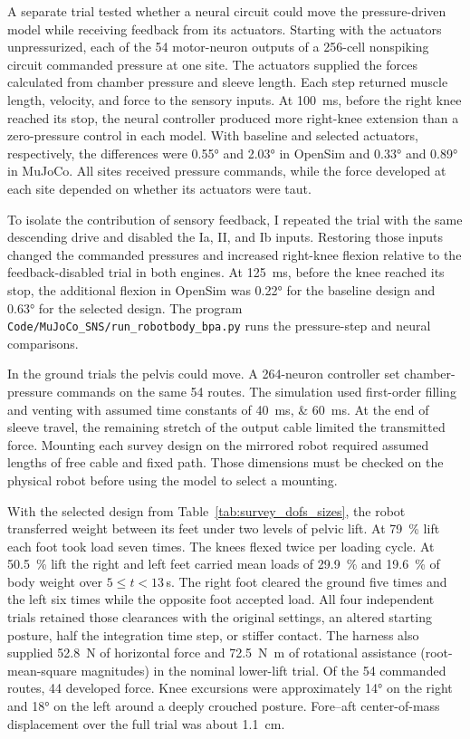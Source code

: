 A separate trial tested whether a neural circuit could move the pressure-driven model while receiving feedback from its actuators. Starting with the actuators unpressurized, each of the 54 motor-neuron outputs of a 256-cell nonspiking circuit commanded pressure at one site. The actuators supplied the forces calculated from chamber pressure and sleeve length. Each step returned muscle length, velocity, and force to the sensory inputs. At \qty{100}{\milli\second}, before the right knee reached its stop, the neural controller produced more right-knee extension than a zero-pressure control in each model. With baseline and selected actuators, respectively, the differences were \ang{0.55} and \ang{2.03} in OpenSim and \ang{0.33} and \ang{0.89} in MuJoCo. All sites received pressure commands, while the force developed at each site depended on whether its actuators were taut.

To isolate the contribution of sensory feedback, I repeated the trial with the same descending drive and disabled the Ia, II, and Ib inputs. Restoring those inputs changed the commanded pressures and increased right-knee flexion relative to the feedback-disabled trial in both engines. At \qty{125}{\milli\second}, before the knee reached its stop, the additional flexion in OpenSim was \ang{0.22} for the baseline design and \ang{0.63} for the selected design. The program \nolinkurl{Code/MuJoCo_SNS/run_robotbody_bpa.py} runs the pressure-step and neural comparisons.

In the ground trials the pelvis could move. A 264-neuron controller set chamber-pressure commands on the same 54 routes. The simulation used first-order filling and venting with assumed time constants of \qtylist{40;60}{\milli\second}. At the end of sleeve travel, the remaining stretch of the output cable limited the transmitted force. Mounting each survey design on the mirrored robot required assumed lengths of free cable and fixed path. Those dimensions must be checked on the physical robot before using the model to select a mounting.

With the selected design from Table~\ref{tab:survey_dofs_sizes}, the robot transferred weight between its feet under two levels of pelvic lift. At \qty{79}{\percent} lift each foot took load seven times. The knees flexed twice per loading cycle. At \qty{50.5}{\percent} lift the right and left feet carried mean loads of \qty{29.9}{\percent} and \qty{19.6}{\percent} of body weight over $5\leq t<13$\,s. The right foot cleared the ground five times and the left six times while the opposite foot accepted load. All four independent trials retained those clearances with the original settings, an altered starting posture, half the integration time step, or stiffer contact. The harness also supplied \qty{52.8}{\newton} of horizontal force and \qty{72.5}{\newton\meter} of rotational assistance (root-mean-square magnitudes) in the nominal lower-lift trial. Of the 54 commanded routes, 44 developed force. Knee excursions were approximately \ang{14} on the right and \ang{18} on the left around a deeply crouched posture. Fore--aft center-of-mass displacement over the full trial was about \qty{1.1}{\centi\meter}.

